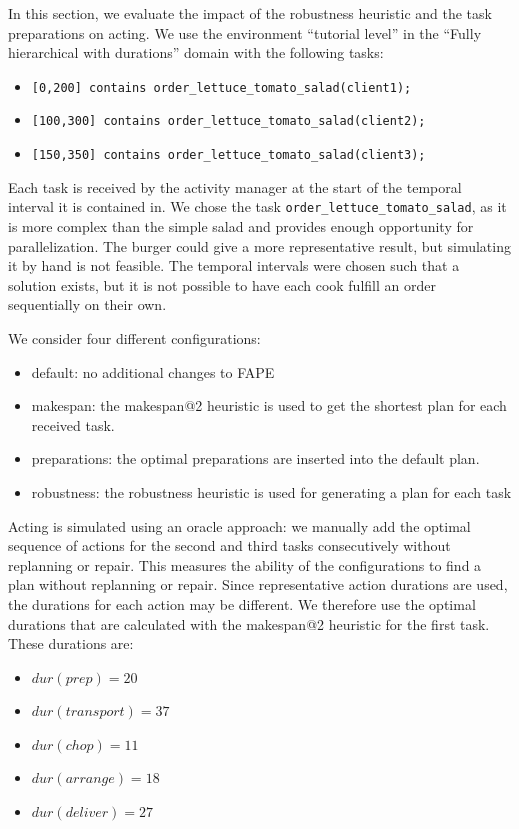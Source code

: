 In this section, we evaluate the impact of the robustness heuristic and the task preparations on acting.
We use the environment ``tutorial level'' in the ``Fully hierarchical with durations'' domain with the following tasks:
\begin{itemize}
  \item \verb|[0,200] contains order_lettuce_tomato_salad(client1);|
  \item \verb|[100,300] contains order_lettuce_tomato_salad(client2);|
  \item \verb|[150,350] contains order_lettuce_tomato_salad(client3);|
\end{itemize}

Each task is received by the activity manager at the start of the temporal interval it is contained in.
We chose the task \verb|order_lettuce_tomato_salad|, as it is more complex than the simple salad and provides enough opportunity for parallelization.
The burger could give a more representative result, but simulating it by hand is not feasible.
The temporal intervals were chosen such that a solution exists, but it is not possible to have each cook fulfill an order sequentially on their own.

We consider four different configurations:
\begin{itemize}
  \item default: no additional changes to \ac{FAPE}
  \item makespan: the makespan@2 heuristic is used to get the shortest plan for each received task.
  \item preparations: the optimal preparations are inserted into the default plan.
  \item robustness: the robustness heuristic is used for generating a plan for each task
\end{itemize}

Acting is simulated using an oracle approach: we manually add the optimal sequence of actions for the second and third tasks consecutively without replanning or repair.
This measures the ability of the configurations to find a plan without replanning or repair.
Since representative action durations are used, the durations for each action may be different.
We therefore use the optimal durations that are calculated with the makespan@2 heuristic for the first task.
These durations are: 
\begin{itemize}
  \item $dur(prep)=20$
  \item $dur(transport)=37$
  \item $dur(chop)=11$
  \item $dur(arrange)=18$
  \item $dur(deliver)=27$
\end{itemize}

